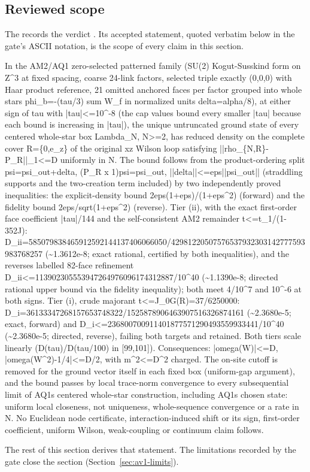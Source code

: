 \subsection{Reviewed scope}
The  records the
verdict . Its accepted statement, quoted verbatim
below in the gate's ASCII notation, is the scope of every claim in this
section.
\begin{gatequote}
In the AM2/AQ1 zero-selected patterned family (SU(2) Kogut-Susskind form on
Z\textasciicircum{}3 at fixed spacing, coarse 24-link factors, selected triple
exactly (0,0,0) with Haar product reference, 21 omitted anchored faces per
factor grouped into whole stars phi\_b=-(tau/3) sum W\_f in normalized units
delta=alpha/8), at either sign of tau with |tau|<=10\textasciicircum{}-8 (the
cap values bound every smaller |tau| because each bound is increasing in
|tau|), the unique untruncated ground state of every centered whole-star box
Lambda\_N, N>=2, has reduced density on the complete cover R=\{0,e\_z\} of the
original xz Wilson loop satisfying ||rho\_\{N,R\}-P\_R||\_1<=D uniformly in N.
The bound follows from the product-ordering split psi=psi\_out+delta, (P\_R x
1)psi=psi\_out, ||delta||<=eps||psi\_out|| (straddling supports and the
two-creation term included) by two independently proved inequalities: the
explicit-density bound 2eps(1+eps)/(1+eps\textasciicircum{}2) (forward) and
the fidelity bound 2eps/sqrt(1+eps\textasciicircum{}2) (reverse). Tier (ii),
with the exact first-order face coefficient |tau|/144 and the self-consistent
AM2 remainder t<=t\_1/(1-352J):
D\_ii=585079838465912592144137406066050/42981220507576537932303142777593983768257
(\textasciitilde{}1.3612e-8; exact rational, certified by both inequalities),
and the reverse\textquotesingle{}s labelled 82-face refinement
D\_ii<=113902305553947264976096174312887/10\textasciicircum{}40
(\textasciitilde{}1.1390e-8; directed rational upper bound via the fidelity
inequality); both meet 4/10\textasciicircum{}7 and 10\textasciicircum{}-6 at
both signs. Tier (i), crude majorant t<=J\_0G(R)=37/6250000:
D\_i=36133347268157653748322/1525878906463907516326874161
(\textasciitilde{}2.3680e-5; exact, forward) and
D\_i<=236800700911401877571290493559933441/10\textasciicircum{}40
(\textasciitilde{}2.3680e-5; directed, reverse), failing both targets and
retained. Both tiers scale linearly (D(tau)/D(tau/100) in [99,101]).
Consequences: |omega(W)|<=D, |omega(W\textasciicircum{}2)-1/4|<=D/2, with
m\textasciicircum{}2<=D\textasciicircum{}2 charged. The on-site cutoff is
removed for the ground vector itself in each fixed box (uniform-gap argument),
and the bound passes by local trace-norm convergence to every subsequential
limit of AQ1\textquotesingle{}s centered whole-star construction, including AQ1\textquotesingle{}s chosen state:
uniform local closeness, not uniqueness, whole-sequence convergence or a rate
in N. No Euclidean node certificate, interaction-induced shift or its sign,
first-order coefficient, uniform Wilson, weak-coupling or continuum claim
follows.
\end{gatequote}
The rest of this section derives that statement. The limitations recorded by
the gate close the section (Section~\ref{sec:av1-limits}).

